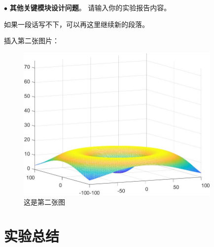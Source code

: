 \documentclass[11pt]{article}
\begin{document}
\vspace{1ex}

\noindent
$\bullet$
\textbf{其他关键模块设计问题}。
请输入你的实验报告内容。

如果一段话写不下，可以再这里继续新的段落。

插入第二张图片：
\begin{figure}[h]
  \centering
  \includegraphics[width=10cm]{fig/Maxwell.pdf}
  \caption{这是第二张图}
\end{figure}

\section{实验总结}
\end{document}
